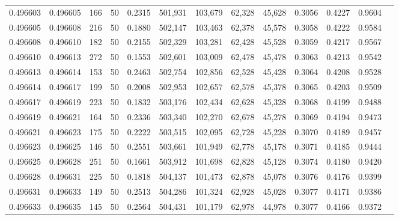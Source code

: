 \begin{tabular}{rrrrrrrrrrrrr}
0.496603 & 0.496605 &   166 &  50 &                                     0.2315 & 501,931 & 103,679 &  62,328 &  45,628 & 0.3056 & 0.4227 & 0.9604 \\
0.496605 & 0.496608 &   216 &  50 &                                     0.1880 & 502,147 & 103,463 &  62,378 &  45,578 & 0.3058 & 0.4222 & 0.9584 \\
0.496608 & 0.496610 &   182 &  50 &                                     0.2155 & 502,329 & 103,281 &  62,428 &  45,528 & 0.3059 & 0.4217 & 0.9567 \\
0.496610 & 0.496613 &   272 &  50 &                                     0.1553 & 502,601 & 103,009 &  62,478 &  45,478 & 0.3063 & 0.4213 & 0.9542 \\
0.496613 & 0.496614 &   153 &  50 &                                     0.2463 & 502,754 & 102,856 &  62,528 &  45,428 & 0.3064 & 0.4208 & 0.9528 \\
0.496614 & 0.496617 &   199 &  50 &                                     0.2008 & 502,953 & 102,657 &  62,578 &  45,378 & 0.3065 & 0.4203 & 0.9509 \\
0.496617 & 0.496619 &   223 &  50 &                                     0.1832 & 503,176 & 102,434 &  62,628 &  45,328 & 0.3068 & 0.4199 & 0.9488 \\
0.496619 & 0.496621 &   164 &  50 &                                     0.2336 & 503,340 & 102,270 &  62,678 &  45,278 & 0.3069 & 0.4194 & 0.9473 \\
0.496621 & 0.496623 &   175 &  50 &                                     0.2222 & 503,515 & 102,095 &  62,728 &  45,228 & 0.3070 & 0.4189 & 0.9457 \\
0.496623 & 0.496625 &   146 &  50 &                                     0.2551 & 503,661 & 101,949 &  62,778 &  45,178 & 0.3071 & 0.4185 & 0.9444 \\
0.496625 & 0.496628 &   251 &  50 &                                     0.1661 & 503,912 & 101,698 &  62,828 &  45,128 & 0.3074 & 0.4180 & 0.9420 \\
0.496628 & 0.496631 &   225 &  50 &                                     0.1818 & 504,137 & 101,473 &  62,878 &  45,078 & 0.3076 & 0.4176 & 0.9399 \\
0.496631 & 0.496633 &   149 &  50 &                                     0.2513 & 504,286 & 101,324 &  62,928 &  45,028 & 0.3077 & 0.4171 & 0.9386 \\
0.496633 & 0.496635 &   145 &  50 &                                     0.2564 & 504,431 & 101,179 &  62,978 &  44,978 & 0.3077 & 0.4166 & 0.9372 \\

\end{tabular}
